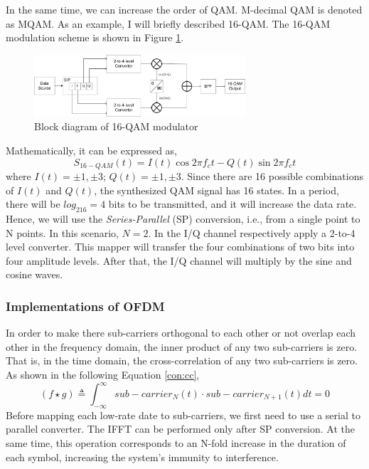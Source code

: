 \documentclass[10pt]{article}
\numberwithin{figure}{section}
\numberwithin{equation}{section}
\begin{document}
In the same time, we can increase the order of QAM. M-decimal QAM is denoted as MQAM. As an example, I will briefly described 16-QAM. The 16-QAM modulation scheme is shown in Figure \ref{fig:structure of QAM}.
\begin{figure}[!ht]
    \centering
    \includegraphics[width=0.7\textwidth]{images/16QAM.pdf}
    \caption{Block diagram of 16-QAM modulator}
    \label{fig:structure of QAM}
\end{figure}
Mathematically, it can be expressed as,
\begin{equation}
S_{16-QAM}(t) = I(t)\cos{2\pi f_ct}-Q(t)\sin{2\pi f_ct} \label{con:16-QAM}
\end{equation}
where $I(t)=\pm 1,\pm 3$; $Q(t)=\pm 1,\pm 3$. Since there are 16 possible combinations of $I(t)$ and $Q(t)$, the synthesized QAM signal has 16 states. In a period, there will be $log_216=4$ bits to be transmitted, and it will increase the data rate. Hence, we will use the \textit{Series-Parallel} (SP) conversion, i.e., from a single point to N points. In this scenario, $N=2$. In the I/Q channel respectively apply a 2-to-4 level converter. This mapper will transfer the four combinations of two bits into four amplitude levels. After that, the I/Q channel will multiply by the sine and cosine waves. 
\subsubsection{Implementations of OFDM}
In order to make there sub-carriers orthogonal to each other or not overlap each other in the frequency domain, the inner product of any two sub-carriers is zero. That is, in the time domain, the cross-correlation of any two sub-carriers is zero. As shown in the following Equation \ref{con:cc},
\begin{equation}
(f \star g) \triangleq \int_{-\infty}^{\infty} sub-carrier_N(t) \cdot sub-carrier_{N+1}(t)dt=0 \label{con:cc}
\end{equation}
Before mapping each low-rate date to sub-carriers, we first need to use a serial to parallel converter. The IFFT can be performed only after SP conversion. At the same time, this operation corresponds to an N-fold increase in the duration of each symbol, increasing the system's immunity to interference.
\end{document}
